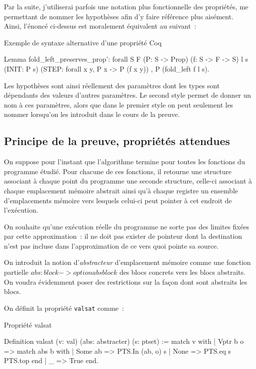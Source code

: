 \documentclass{article}
\begin{document}
Par la suite, j'utiliserai parfois une notation plus fonctionnelle des
propriétés, me permettant de nommer les hypothèses afin d'y faire référence
plus aisément. Ainsi, l'énoncé ci-dessus est moralement équivalent au suivant~:

\begin{coqcode}
\caption{Exemple de syntaxe alternative d'une propriété Coq}
\begin{english}
\begin{coq}
Lemma fold_left_preserves_prop':
forall S F (P: S -> Prop) (f: S -> F -> S) l s
  (INIT: P s)
  (STEP: forall x y, P x -> P (f x y))
  ,
  P (fold_left f l s).
\end{coq}
\end{english}
\end{coqcode}

Les hypothèses sont ainsi réellement des paramètres dont les types sont
dépendants des valeurs d'autres paramètres. Le second style permet de donner un
nom à ces paramètres, alors que dans le premier style on peut seulement les
nommer lorsqu'on les introduit dans le cours de la preuve.

\subsection{Principe de la preuve, propriétés attendues}

On suppose pour l'instant que l'algorithme termine pour toutes les fonctions du
programme étudié. Pour chacune de ces fonctions, il retourne une structure
associant à chaque point du programme une seconde structure, celle-ci associant
à chaque emplacement mémoire abstrait ainsi qu'à chaque registre un ensemble
d'emplacements mémoire vers lesquels celui-ci peut pointer à cet endroit de
l'exécution.

On souhaite qu'une exécution réelle du programme ne sorte pas des limites
fixées par cette approximation~: il ne doit pas exister de pointeur dont la
destination n'est pas incluse dans l'approximation de ce vers quoi pointe sa
source.

On introduit la notion d'{\it abstracteur} d'emplacement mémoire comme une
fonction partielle $abs: block -> option absblock$ des blocs
concrets vers les blocs abstraits. On voudra évidemment poser des restrictions
sur la façon dont sont abstraits les blocs.

On définit la propriété \texttt{valsat} comme~:

\begin{coqcode}
\caption{Propriété valsat}
\begin{english}
\begin{coq}
Definition valsat (v: val) (abs: abstracter) (s: ptset) :=
match v with
| Vptr b o =>
  match abs b with
  | Some ab => PTS.In (ab, o) s
  | None    => PTS.eq s PTS.top
  end
| _        => True
end.
\end{coq}
\end{english}
\end{coqcode}
\end{document}
